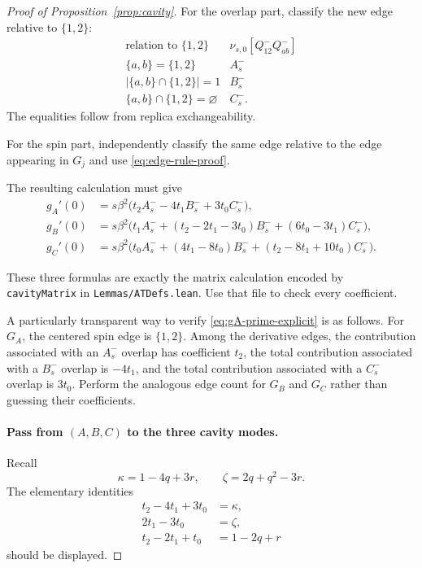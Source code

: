 \begin{proof}[Proof of Proposition~\ref{prop:cavity}]
For the overlap part, classify the new edge relative to $\{1,2\}$:
\[
 \begin{array}{c|c}
 \text{relation to }\{1,2\}
 &
 \nu_{s,0}[Q^-_{12}Q^-_{ab}]
 \\ \hline
 \{a,b\}=\{1,2\}
 &
 A_s^-
 \\
 |\{a,b\}\cap\{1,2\}|=1
 &
 B_s^-
 \\
 \{a,b\}\cap\{1,2\}=\varnothing
 &
 C_s^- .
 \end{array}
\]
The equalities follow from replica exchangeability.

For the spin part, independently classify the same edge relative to the
edge appearing in $G_j$ and use
\eqref{eq:edge-rule-proof}.

The resulting calculation must give
\begin{align}
 g_A'(0)
 &=
 s\beta^2
 \bigl(
 t_2 A_s^- -4t_1B_s^-+3t_0C_s^-
 \bigr),
 \label{eq:gA-prime-explicit}\\
 g_B'(0)
 &=
 s\beta^2
 \bigl(
 t_1A_s^-
 +(t_2-2t_1-3t_0)B_s^-
 +(6t_0-3t_1)C_s^-
 \bigr),
 \label{eq:gB-prime-explicit}\\
 g_C'(0)
 &=
 s\beta^2
 \bigl(
 t_0A_s^-
 +(4t_1-8t_0)B_s^-
 +(t_2-8t_1+10t_0)C_s^-
 \bigr).
 \label{eq:gC-prime-explicit}
\end{align}

These three formulas are exactly the matrix calculation encoded by
\texttt{cavityMatrix} in
\texttt{Lemmas/ATDefs.lean}.  Use that file to check every coefficient.

A particularly transparent way to verify
\eqref{eq:gA-prime-explicit} is as follows.
For $G_A$, the centered spin edge is $\{1,2\}$.  Among the derivative edges,
the contribution associated with an $A_s^-$ overlap has coefficient $t_2$,
the total contribution associated with a $B_s^-$ overlap is $-4t_1$, and the
total contribution associated with a $C_s^-$ overlap is $3t_0$.
Perform the analogous edge count for $G_B$ and $G_C$ rather than guessing
their coefficients.

\paragraph{Pass from $(A,B,C)$ to the three cavity modes.}

Recall
\[
 \kappa=1-4q+3r,
 \qquad
 \zeta=2q+q^2-3r.
\]
The elementary identities
\begin{align}
 t_2-4t_1+3t_0&=\kappa,
 \label{eq:kappa-t}\\
 2t_1-3t_0&=\zeta,
 \label{eq:zeta-t}\\
 t_2-2t_1+t_0&=1-2q+r
 \label{eq:replicon-t}
\end{align}
should be displayed.


\end{proof}
